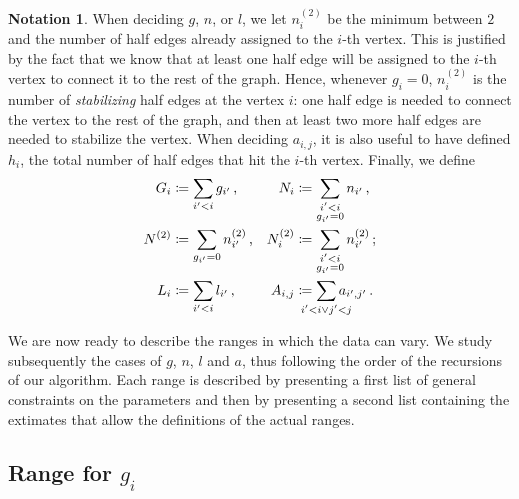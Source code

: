 \documentclass{amsart}
\theoremstyle{plain}
\theoremstyle{definition}
\newtheorem{notation}[theorem]{Notation}
\begin{document}
\begin{notation}
  When deciding $g$, $n$, or $l$, we let $n^{(2)}_i$ be the minimum
  between $2$ and the number of half edges already assigned to the
  $i$-th vertex. This is justified by the fact that we know that at
  least one half edge will be assigned to the $i$-th vertex to connect
  it to the rest of the graph. Hence, whenever $g_i = 0$, $n^{(2)}_i$
  is the number of \emph{stabilizing\/} half edges at the vertex $i$:
  one half edge is needed to connect the vertex to the rest of the graph,
  and then at least two more half edges are needed to stabilize the
  vertex. When deciding $a_{i,j}$, it is also useful to have defined
  $h_i$, the total number of half edges that hit the $i$-th
  vertex. Finally, we define
  \begin{align*}
    G_i &\coloneqq \sum_{i^\prime < i} g_{i^\prime}\,\text{,} &
    N_i &\coloneqq \sum_{\substack{i^\prime < i\\g_{i^\prime} = 0}} n_{i^\prime}\,\text{,}\\
    N^{(2)} &\coloneqq \sum_{g_{i^\prime} = 0} n^{(2)}_{i^\prime}\,\text{,} &
    N^{(2)}_i &\coloneqq \sum_{\substack{i^\prime < i\\g_{i^\prime} = 0}} n^{(2)}_{i^\prime}\,\text{;}\\
    L_i &\coloneqq \sum_{i^\prime < i} l_{i^\prime}\,\text{,} &
    A_{i,j} &\coloneqq \sum_{\mathclap{i^\prime < i \vee j^\prime < j}} a_{i^\prime, j^\prime}\,\text{.}
  \end{align*}
\end{notation}

We are now ready to describe the ranges in which the data can vary.
We study subsequently the cases of $g$, $n$, $l$ and $a$, thus
following the order of the recursions of our algorithm. Each range is
described by presenting a first list of general constraints on the
parameters and then by presenting a second list containing the
extimates that allow the definitions of the actual ranges.


\subsection{Range for $g_i$}
\end{document}
